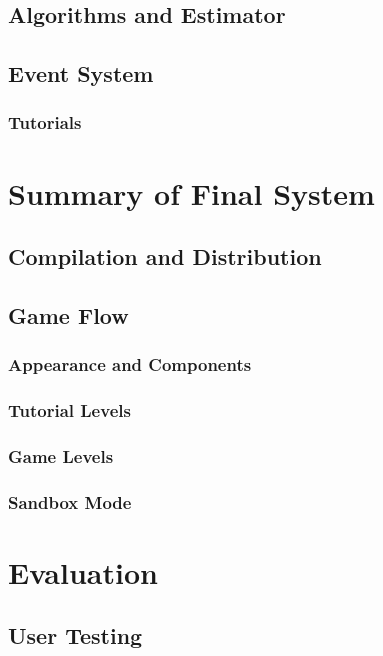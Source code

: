 \documentclass[msc,deptreport, cs]{infthesis}
\begin{document}
\section{Algorithms and Estimator}

\section{Event System} \label{sec:event}

\subsection{Tutorials}

\chapter{Summary of Final System}

\section{Compilation and Distribution}

\section{Game Flow}

\subsection{Appearance and Components}

\subsection{Tutorial Levels}

\subsection{Game Levels}

\subsection{Sandbox Mode}

\chapter{Evaluation}

\section{User Testing}
\end{document}
